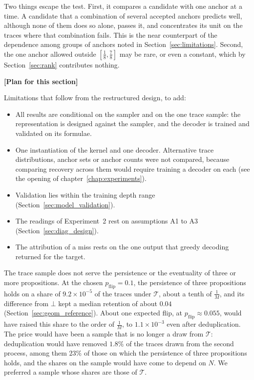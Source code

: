 \documentclass[titlepage,a4paper,11pt]{report}
\newenvironment{RSplan}{\par\medskip\color{orange!85!black}\noindent\textbf{[Plan for this section]}\par}{\par\medskip}
\begin{document}
    Two things escape the test. First, it compares a candidate with one anchor at a time. A candidate that a combination of several accepted anchors predicts well, although none of them does so alone, passes it, and concentrates its unit on the traces where that combination fails. This is the near counterpart of the dependence among groups of anchors noted in Section~\ref{sec:limitations}. Second, the one anchor allowed outside $[\tfrac18,\tfrac78]$ may be rare, or even a constant, which by Section~\ref{sec:rank} contributes nothing.
    \begin{RSplan}
    Limitations that follow from the restructured design, to add:
    \begin{itemize}
        \item All results are conditional on the sampler and on the one trace sample: the representation is designed against the sampler, and the decoder is trained and validated on its formulae.
        \item One instantiation of the kernel and one decoder. Alternative trace distributions, anchor sets or anchor counts were not compared, because comparing recovery across them would require training a decoder on each (see the opening of chapter~\ref{chap:experiments}).
        \item Validation lies within the training depth range (Section~\ref{sec:model_validation}).
        \item The readings of Experiment~2 rest on assumptions A1 to A3 (Section~\ref{sec:diag_design}).
        \item The attribution of a miss rests on the one output that greedy decoding returned for the target.
    \end{itemize}
    \end{RSplan}

    The trace sample does not serve the persistence or the eventuality of three or more propositions. At the chosen $p_{\text{flip}}=0.1$, the persistence of three propositions holds on a share of $9.2\times10^{-5}$ of the traces under $\mathcal T$, about a tenth of $\frac1M$, and its difference from $\bot$ kept a median retention of about $0.04$ (Section~\ref{sec:geom_reference}). About one expected flip, at $p_{\text{flip}}\approx0.055$, would have raised this share to the order of $\frac1M$, to $1.1\times10^{-3}$ even after deduplication. The price would have been a sample that is no longer a draw from $\mathcal T$: deduplication would have removed $1.8\%$ of the traces drawn from the second process, among them $23\%$ of those on which the persistence of three propositions holds, and the shares on the sample would have come to depend on $N$. We preferred a sample whose shares are those of $\mathcal T$.
\end{document}
